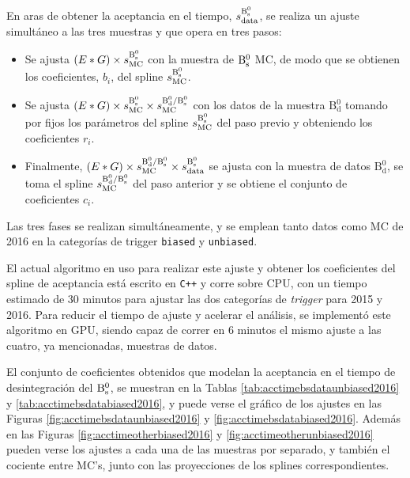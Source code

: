 En aras de obtener la aceptancia en el tiempo, $s_{\text{data}}^{\text{B}{}_{\text{s}}^{0}} $, se realiza un ajuste simultáneo a las tres muestras y que opera en tres pasos:
\begin{itemize}
  \item Se ajusta $(E*G) \times s_{\text{MC}}^{\text{B}{}_{\text{s}}^{0}}$  con la muestra de $\text{B}{}_{\text{s}}^{0}$ MC, de modo que se obtienen los coeficientes, $b_i$, del spline $s_{\text{MC}}^{\text{B}{}_{\text{s}}^{0}} $.
  \item Se ajusta $(E*G) \times s_{\text{MC}}^{\text{B}{}_{\text{s}}^{0}} \times s_{\text{MC}}^{\mathrm{B_d^0}/\text{B}{}_{\text{s}}^{0}} $ con los datos de la muestra $\mathrm{B_d^0}$ tomando por fijos los parámetros del spline $s_{\text{MC}}^{\text{B}{}_{\text{s}}^{0}} $ del paso previo y obteniendo los coeficientes $r_i$.
  \item Finalmente, $(E*G) \times s_{\text{MC}}^{\mathrm{B_d^0}/\text{B}{}_{\text{s}}^{0}} \times s_{\text{data}}^{\text{B}{}_{\text{s}}^{0}} $ se ajusta con la muestra de datos $\mathrm{B_d^0}$, se toma el spline $s_{\text{MC}}^{\mathrm{B_d^0}/\text{B}{}_{\text{s}}^{0}} $ del paso anterior y se obtiene el conjunto de coeficientes $c_i$.
\end{itemize}
%
Las tres fases se realizan simultáneamente, y se emplean tanto datos como MC de 2016 en la categorías de trigger \texttt{biased} y \texttt{unbiased}.


El actual algoritmo en uso para realizar este ajuste y obtener los coeficientes del spline de aceptancia está escrito en \texttt{C++} y corre sobre CPU, con un tiempo estimado de 30 minutos para ajustar las dos categorías de \textit{trigger} para 2015 y 2016. Para reducir el tiempo de ajuste y acelerar el análisis, se implementó este algoritmo en GPU, siendo capaz de correr en 6 minutos el mismo ajuste a las cuatro, ya mencionadas, muestras de datos.

El conjunto de coeficientes obtenidos que modelan la aceptancia en el tiempo de desintegración del $\text{B}{}_{\text{s}}^{0}$,
 se muestran en la Tablas \ref{tab:acctimebsdataunbiased2016} y \ref{tab:acctimebsdatabiased2016}, y puede verse el gráfico de los ajustes en las Figuras \ref{fig:acctimebsdataunbiased2016} y \ref{fig:acctimebsdatabiased2016}. Además en las Figuras \ref{fig:acctimeotherbiased2016} y \ref{fig:acctimeotherunbiased2016} pueden verse los ajustes a cada una de las muestras por separado, y también el cociente entre MC's, junto con las proyecciones de los splines correspondientes.

